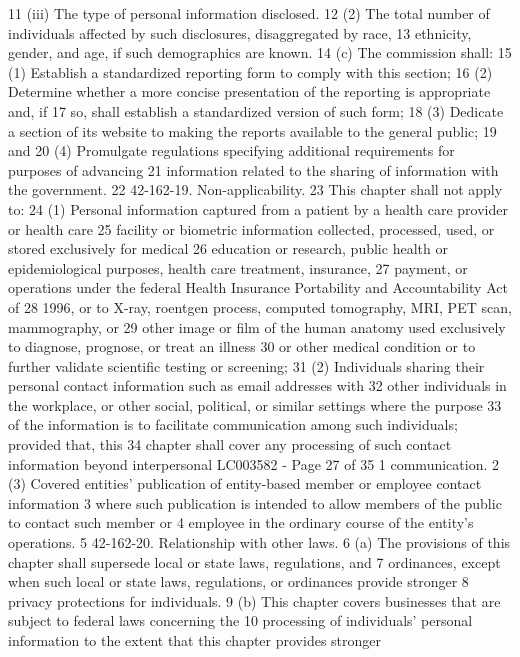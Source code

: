 11 (iii) The type of personal information disclosed.
12 (2) The total number of individuals affected by such disclosures, disaggregated by race,
13 ethnicity, gender, and age, if such demographics are known.
14 (c) The commission shall:
15 (1) Establish a standardized reporting form to comply with this section;
16 (2) Determine whether a more concise presentation of the reporting is appropriate and, if
17 so, shall establish a standardized version of such form;
18 (3) Dedicate a section of its website to making the reports available to the general public;
19 and
20 (4) Promulgate regulations specifying additional requirements for purposes of advancing
21 information related to the sharing of information with the government.
22 42-162-19. Non-applicability.
23 This chapter shall not apply to:
24 (1) Personal information captured from a patient by a health care provider or health care
25 facility or biometric information collected, processed, used, or stored exclusively for medical
26 education or research, public health or epidemiological purposes, health care treatment, insurance,
27 payment, or operations under the federal Health Insurance Portability and Accountability Act of
28 1996, or to X-ray, roentgen process, computed tomography, MRI, PET scan, mammography, or
29 other image or film of the human anatomy used exclusively to diagnose, prognose, or treat an illness
30 or other medical condition or to further validate scientific testing or screening;
31 (2) Individuals sharing their personal contact information such as email addresses with
32 other individuals in the workplace, or other social, political, or similar settings where the purpose
33 of the information is to facilitate communication among such individuals; provided that, this
34 chapter shall cover any processing of such contact information beyond interpersonal 
LC003582 - Page 27 of 35
1 communication.
2 (3) Covered entities' publication of entity-based member or employee contact information
3 where such publication is intended to allow members of the public to contact such member or
4 employee in the ordinary course of the entity's operations.
5 42-162-20. Relationship with other laws.
6 (a) The provisions of this chapter shall supersede local or state laws, regulations, and
7 ordinances, except when such local or state laws, regulations, or ordinances provide stronger
8 privacy protections for individuals.
9 (b) This chapter covers businesses that are subject to federal laws concerning the
10 processing of individuals' personal information to the extent that this chapter provides stronger
